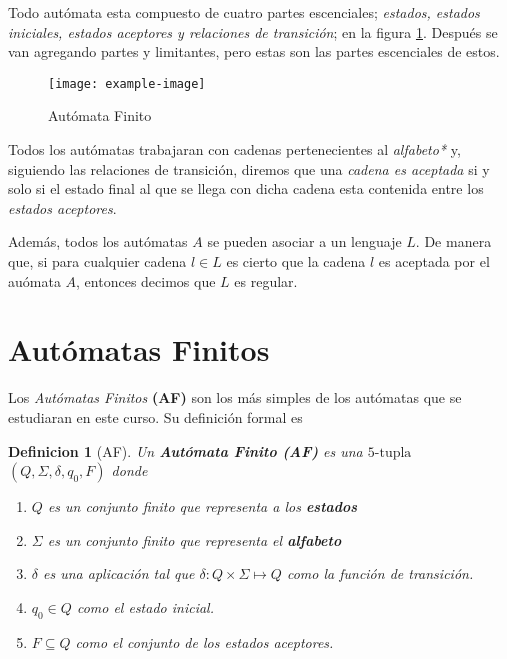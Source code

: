 \documentclass[12pt]{book}
\newtheorem{definicion}{Definicion}[part]
\begin{document}
	\par Todo aut\'omata esta compuesto de cuatro partes escenciales; \textit{estados, estados iniciales, estados aceptores y relaciones de transici\'on}; en la figura \ref{fig: automata}. Despu\'es se van agregando partes y limitantes, pero estas son las partes escenciales de estos.

	\begin{figure}[h]
		\centering
			\texttt{[image: example-image]}
		\caption{Aut\'omata Finito}
		\label{fig: automata}
	\end{figure}
	
	\par Todos los aut\'omatas trabajaran con cadenas pertenecientes al \textit{alfabeto*} y, siguiendo las relaciones de transici\'on, diremos que una \textit{cadena es aceptada} si y solo si el estado final al que se llega con dicha cadena esta contenida entre los \textit{estados aceptores}.
	
	\par Adem\'as, todos los aut\'omatas $A$ se pueden asociar a un lenguaje $L$. De manera que, si para cualquier cadena $l \in L$ es cierto que la cadena $l$ es aceptada por el au\'omata $A$, entonces decimos que $L$ es regular.
	
	
	\section{Aut\'omatas Finitos}
	
		\par Los \textit{Aut\'omatas Finitos} \textbf{(AF)} son los m\'as simples de los aut\'omatas que se estudiaran en este curso. Su definici\'on formal es
		
		\begin{definicion}[AF]
			Un \textbf{Aut\'omata Finito (AF)} es una $5\text{-tupla}$ $(Q, \Sigma, \delta, q_0, F)$ donde
			\begin{enumerate}
				\item $Q$ es un conjunto finito que representa a los \textbf{estados}
				\item $\Sigma$ es un conjunto finito que representa el \textbf{alfabeto}
				\item $\delta$ es una aplicaci\'on tal que $\delta:Q\times\Sigma \mapsto Q$ como la funci\'on de transici\'on.
				\item $q_0 \in Q$ como el estado inicial.
				\item $F\subseteq Q$ como el conjunto de los estados aceptores. 
			\end{enumerate}
		\end{definicion}
\end{document}
